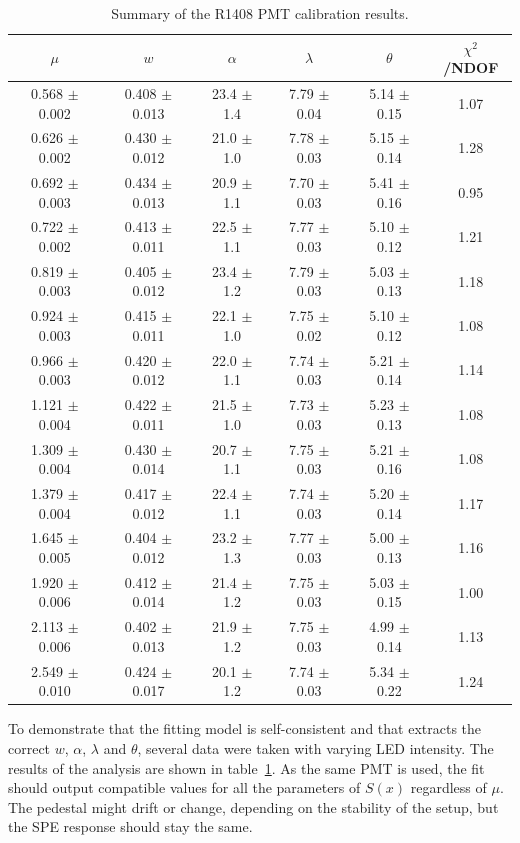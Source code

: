 \documentclass[a4paper,11pt]{article}
\begin{document}
\begin{table}[t!]
\centering
\begin{tabular}{| c  || c | c | c | c || c |}
\hline
$\mu$  &  $w$ &  $\alpha$ &  $\lambda$ &  $\theta$ & $\chi^2$/NDOF\\[0.6ex] \hline\hline
0.568 $\pm$ 0.002 & 0.408 $\pm$ 0.013 & 23.4 $\pm$ 1.4 & 7.79 $\pm$ 0.04 & 5.14 $\pm$ 0.15 & 1.07 \\
0.626 $\pm$ 0.002 & 0.430 $\pm$ 0.012 & 21.0 $\pm$ 1.0 & 7.78 $\pm$ 0.03 & 5.15 $\pm$ 0.14 & 1.28 \\
0.692 $\pm$ 0.003 & 0.434 $\pm$ 0.013 & 20.9 $\pm$ 1.1 & 7.70 $\pm$ 0.03 & 5.41 $\pm$ 0.16 & 0.95 \\
0.722 $\pm$ 0.002 & 0.413 $\pm$ 0.011 & 22.5 $\pm$ 1.1 & 7.77 $\pm$ 0.03 & 5.10 $\pm$ 0.12 & 1.21 \\
0.819 $\pm$ 0.003 & 0.405 $\pm$ 0.012 & 23.4 $\pm$ 1.2 & 7.79 $\pm$ 0.03 & 5.03 $\pm$ 0.13 & 1.18 \\
0.924 $\pm$ 0.003 & 0.415 $\pm$ 0.011 & 22.1 $\pm$ 1.0 & 7.75 $\pm$ 0.02 & 5.10 $\pm$ 0.12 & 1.08 \\
0.966 $\pm$ 0.003 & 0.420 $\pm$ 0.012 & 22.0 $\pm$ 1.1 & 7.74 $\pm$ 0.03 & 5.21 $\pm$ 0.14 & 1.14 \\
1.121 $\pm$ 0.004 & 0.422 $\pm$ 0.011 & 21.5 $\pm$ 1.0 & 7.73 $\pm$ 0.03 & 5.23 $\pm$ 0.13 & 1.08 \\
1.309 $\pm$ 0.004 & 0.430 $\pm$ 0.014 & 20.7 $\pm$ 1.1 & 7.75 $\pm$ 0.03 & 5.21 $\pm$ 0.16 & 1.08 \\
1.379 $\pm$ 0.004 & 0.417 $\pm$ 0.012 & 22.4 $\pm$ 1.1 & 7.74 $\pm$ 0.03 & 5.20 $\pm$ 0.14 & 1.17 \\
1.645 $\pm$ 0.005 & 0.404 $\pm$ 0.012 & 23.2 $\pm$ 1.3 & 7.77 $\pm$ 0.03 & 5.00 $\pm$ 0.13 & 1.16 \\
1.920 $\pm$ 0.006 & 0.412 $\pm$ 0.014 & 21.4 $\pm$ 1.2 & 7.75 $\pm$ 0.03 & 5.03 $\pm$ 0.15 & 1.00 \\
2.113 $\pm$ 0.006 & 0.402 $\pm$ 0.013 & 21.9 $\pm$ 1.2 & 7.75 $\pm$ 0.03 & 4.99 $\pm$ 0.14 & 1.13 \\
2.549 $\pm$ 0.010 & 0.424 $\pm$ 0.017 & 20.1 $\pm$ 1.2 & 7.74 $\pm$ 0.03 & 5.34 $\pm$ 0.22 & 1.24
\\[0.6ex] \hline\hline
\end{tabular}
\caption{Summary of the R1408 PMT calibration results.}
\label{tab:money}
\end{table}

To demonstrate that the fitting model is self-consistent and that extracts the correct $w$, $\alpha$, $\lambda$ and $\theta$, several data were taken with varying LED intensity. 
The results of the analysis are shown in table~\ref{tab:money}. 
As the same PMT is used, the fit should output compatible values for all the parameters of $S(x)$ regardless of $\mu$. 
The pedestal might drift or change, depending on the stability of the setup, but the SPE response should stay the same. 
\end{document}
